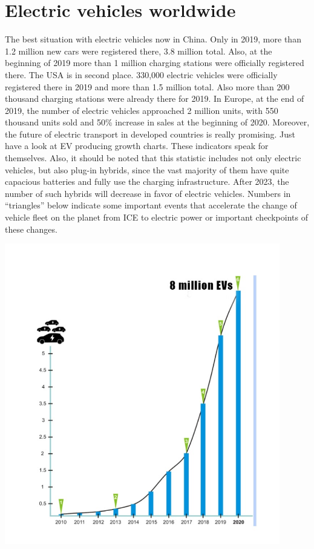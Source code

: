 \documentclass[a4paper,12pt]{report}
\begin{document}
\section{Electric vehicles worldwide}
The best situation with electric vehicles now in China. Only in 2019, more than 1.2 million new cars were registered there, 3.8 million total. Also, at the beginning of 2019  more than 1 million charging stations were officially registered there.
The USA is in second place. 330,000 electric vehicles were officially registered there in 2019 and more than 1.5 million  total. Also more than 200 thousand charging stations were already  there for 2019.
In Europe, at the end of 2019, the number of electric vehicles approached 2 million units, with 550 thousand units sold and 50\% increase in sales at the beginning of 2020. Moreover, the future of electric transport in developed countries is really promising.
Just have a look at  EV producing growth charts. These indicators speak for themselves. Also, it should be noted that this statistic includes not only electric vehicles, but also plug-in hybrids, since the vast majority of them have quite capacious batteries and fully use the charging infrastructure. After 2023, the number of such hybrids will decrease in favor of electric vehicles.
Numbers in “triangles”  below indicate some important events that accelerate the change of vehicle fleet on the planet from ICE to electric power  or important checkpoints  of these changes.

\vspace*{1cm}
\includegraphics[width=12cm]{chart1en}
\vspace*{1cm}
\end{document}
